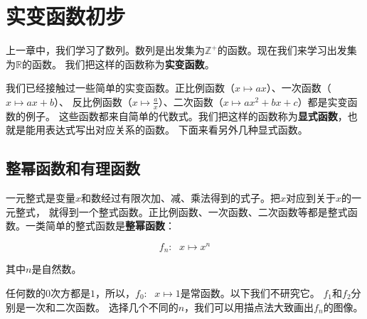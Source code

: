 \documentclass[12pt,UTF8]{ctexbook}
\begin{document}
\chapter{实变函数初步}

上一章中，我们学习了数列。数列是出发集为$\mathbb{Z}^+$的函数。现在我们来学习出发集为$\mathbb{R}$的函数。
我们把这样的函数称为\textbf{实变函数}。

我们已经接触过一些简单的实变函数。正比例函数（$x\mapsto ax$）、一次函数（$x\mapsto ax + b$）、
反比例函数（$x\mapsto \frac{a}{x}$）、二次函数（$x\mapsto ax^2 + bx + c$）都是实变函数的例子。
这些函数都来自简单的代数式。我们把这样的函数称为\textbf{显式函数}，也就是能用表达式写出对应关系的函数。
下面来看另外几种显式函数。

\section{整幂函数和有理函数}

一元整式是变量$x$和数经过有限次加、减、乘法得到的式子。把$x$对应到关于$x$的一元整式，
就得到一个整式函数。正比例函数、一次函数、二次函数等都是整式函数。一类简单的整式函数是\textbf{整幂函数}：

$$f_n: \;\,\, x \mapsto x^n$$

其中$n$是自然数。

任何数的$0$次方都是$1$，所以，$f_0:\;\,\, x\mapsto 1$是常函数。以下我们不研究它。
$f_1$和$f_2$分别是一次和二次函数。
选择几个不同的$n$，我们可以用描点法大致画出$f_n$的图像。
\end{document}
